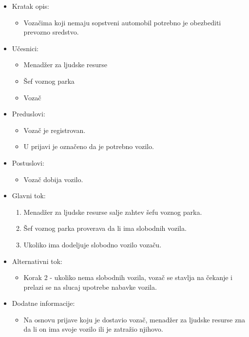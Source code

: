 \begin{itemize}
	\item Kratak opis:
		\begin{itemize}
			\item Vozačima koji nemaju sopstveni automobil potrebno je obezbediti prevozno sredstvo.		
		\end{itemize}
	\item Učesnici:
		\begin{itemize}
		    \item Menadžer za ljudske resurse
		    \item Šef voznog parka
		    \item Vozač
		\end{itemize}
	\item Preduslovi:
		\begin{itemize}
		    \item Vozač je registrovan.
		    \item U prijavi je označeno da je potrebno vozilo.
		\end{itemize}
	\item Postuslovi:
		\begin{itemize}
			\item Vozač dobija vozilo.
	    \end{itemize}
	\item Glavni tok:
		\begin{enumerate}
		    \item Menadžer za ljudske resurse salje zahtev šefu voznog parka.
		    \item Šef voznog parka proverava da li ima slobodnih vozila.
		    \item Ukoliko ima dodeljuje slobodno vozilo vozaču.
		\end{enumerate}
	\item Alternativni tok:
		\begin{itemize}
		    \item Korak 2 - ukoliko nema slobodnih vozila, vozač se stavlja na čekanje i prelazi se na slucaj upotrebe nabavke vozila.
		\end{itemize}
	\item Dodatne informacije:
		\begin{itemize}
			\item Na osnovu prijave koju je dostavio vozač, menadžer za ljudske resurse zna da li on ima svoje vozilo ili je zatražio njihovo.
		\end{itemize}
\end{itemize}


